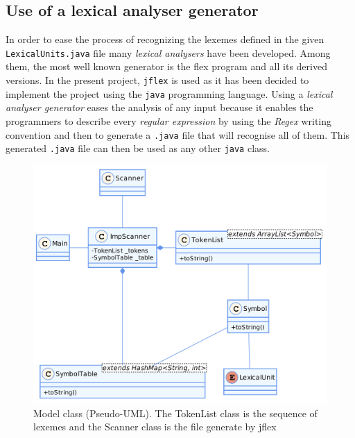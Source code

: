 \documentclass[a4paper,11pt]{article}
\begin{document}
  \subsection{Use of a lexical analyser generator}
    In order to ease the process of recognizing the lexemes defined in the given \verb|LexicalUnits.java| file many \textit{lexical analysers} have been developed. Among them, the most well known generator is the flex program and all its derived versions. In the present project, \verb|jflex| is used as it has been decided to implement the project using the \verb|java| programming language. Using a \textit{lexical analyser generator} eases the analysis of any input because it enables the programmers to describe every \textit{regular expression} by using the \textit{Regex} writing convention and then to generate a \verb|.java| file that will recognise all of them. This generated \verb|.java| file can then be used as any other \verb|java| class.
    \begin{figure}[h]
      \includegraphics[scale=0.15]{./img/class_diag.png}
      \centering
      \caption{Model class (Pseudo-UML). The TokenList class is the sequence of lexemes and the Scanner class is the file generate by jflex}
    \end{figure}
  
\end{document}
